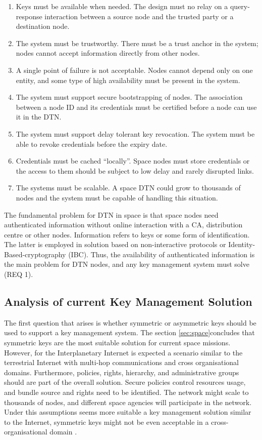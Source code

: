 \begin{enumerate}
    \item Keys must be available when needed. The design must no relay on a query-response interaction between a source node and the trusted party or a destination node.
    \item The system must be trustworthy. There must be a trust anchor in the system; nodes cannot accept information directly from other nodes. 
    \item A single point of failure is not acceptable. Nodes cannot depend only on one entity, and some type of high availability must be present in the system.
    \item The system must support secure bootstrapping of nodes. The association between a node ID and its credentials must be certified before a node can use it in the DTN.
    \item The system must support delay tolerant key revocation. The system must be able to revoke credentials before the expiry date. 
    \item Credentials must be cached ``locally''. Space nodes must store credentials or the access to them should be subject to low delay and rarely disrupted links.
    \item The systems must be scalable. A space DTN could grow to thousands of nodes and the system must be capable of handling this situation. 
\end{enumerate}


The fundamental problem for DTN in space is that space nodes need authenticated information without online interaction with a CA, distribution centre or other nodes. Information refers to keys or some form of identification. The latter is employed in solution based on non-interactive protocols or Identity-Based-cryptography (IBC). Thus, the availability of authenticated information is the main problem for DTN nodes, and any key management system must solve (REQ 1).


\subsection{Analysis of current Key Management Solution}


The first question that arises is whether symmetric or asymmetric keys should be used to support a key management system.  The section  \ref{sec:space}concludes that symmetric keys are the most suitable solution for current space missions. However, for the Interplanetary Internet is expected a scenario similar to the terrestrial Internet \cite{rationale2010requirements} with multi-hop communications and cross organisational domains. Furthermore, policies, rights, hierarchy, and administrative groups should are part of the overall solution. Secure policies control resources usage, and bundle source and rights need to be identified. The network might scale to thousands of nodes, and different space agencies will participate in the network. Under this assumptions seems more suitable a key management solution similar to the Internet, symmetric keys might not be even acceptable in a cross-organisational domain \cite{ivancic2009security}.

